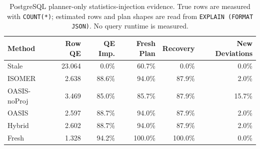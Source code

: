 \begin{table}[t]
  \centering
  \small
  \caption{PostgreSQL planner-only statistics-injection evidence. True rows are measured with \texttt{COUNT(*)}; estimated rows and plan shapes are read from \texttt{EXPLAIN (FORMAT JSON)}. No query runtime is measured.}
  \label{tab:postgres_planner_stats_injection}
  \setlength{\tabcolsep}{4pt}
  \begin{tabular}{lrrrrr}
    \toprule
    Method & Row QE & QE Imp. & Fresh Plan & Recovery & New Deviations \\
    \midrule
    Stale & 23.064 & 0.0\% & 60.7\% & 0.0\% & 0.0\% \\
    ISOMER & 2.638 & 88.6\% & 94.0\% & 87.9\% & 2.0\% \\
    OASIS-noProj & 3.469 & 85.0\% & 85.7\% & 87.9\% & 15.7\% \\
    OASIS & 2.597 & 88.7\% & 94.0\% & 87.9\% & 2.0\% \\
    Hybrid & 2.602 & 88.7\% & 94.0\% & 87.9\% & 2.0\% \\
    Fresh & 1.328 & 94.2\% & 100.0\% & 100.0\% & 0.0\% \\
    \bottomrule
  \end{tabular}
\end{table}
